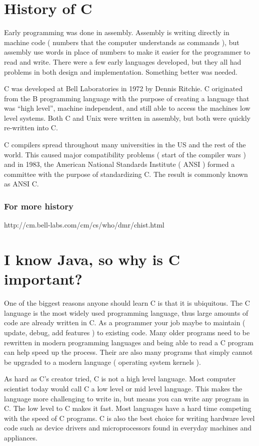 \documentclass[10pt,a4paper]{paper}
\begin{document}
\section{History of C}

Early programming was done in assembly.  Assembly is writing directly in machine code ( numbers that the computer understands as commands ), but assembly use words in place of numbers to make it easier for the programmer to read and write.  There were a few early languages developed, but they all had problems in both design and implementation.  Something better was needed.

C was developed at Bell Laboratories in 1972 by Dennis Ritchie.  C originated from the B programming language with the purpose of creating a language that was ``high level'', machine independent, and still able to access the machines low level systems.  Both C and Unix were written in assembly, but both were quickly re-written into C.  

C compilers spread throughout many universities in the US and the rest of the world.  This caused major compatibility problems ( start of the compiler wars ) and in 1983, the American National Standards Institute ( ANSI ) formed a committee with the purpose of standardizing C.  The result is commonly known as ANSI C.

\subsubsection*{For more history}
http://cm.bell-labs.com/cm/cs/who/dmr/chist.html

\section{ I know Java, so why is C important? }

One of the biggest reasons anyone should learn C is that it is ubiquitous.  The C language is the most widely used programming language, thus large amounts of code are already written in C.  As a programmer your job maybe to maintain ( update, debug, add features ) to existing code.  Many older programs need to be rewritten in modern programming languages and being able to read a C program can help speed up the process.  Their are also many programs that simply cannot be upgraded to a modern language ( operating system kernels ).

As hard as C's creator tried, C is not a high level language.  Most computer scientist today would call C a low level or mid level language.  This makes the language more challenging to write in, but means you can write any program in C.  The low level to C makes it fast.  Most languages have a hard time competing with the speed of C programs.
C is also the best choice for writing hardware level code such as device drivers and microprocessors found in everyday machines and appliances. 
\end{document}
